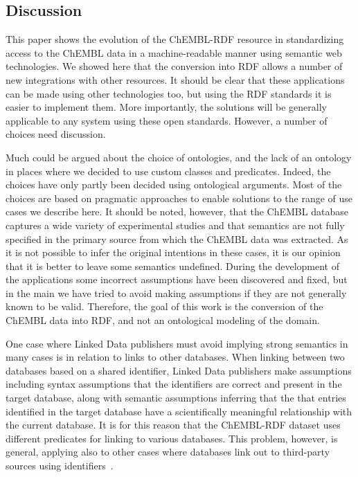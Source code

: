 \documentclass[10pt]{bmc_article}
\newenvironment{bmcformat}{\begin{raggedright}\baselineskip20pt\sloppy\setboolean{publ}{false}}{\end{raggedright}\baselineskip20pt\sloppy}
\begin{document}
\begin{bmcformat}
\section*{Discussion}

This paper shows the evolution of the ChEMBL-RDF resource in standardizing access to the
ChEMBL data in a machine-readable manner using semantic web technologies. We showed here
that the conversion into RDF allows a number of new integrations with other resources.
It should be clear that these applications can be made using other technologies too, but
using the RDF standards it is easier to implement them. More importantly, the solutions
will be generally applicable to any system using these open standards. However, a number
of choices need discussion. 

Much could be argued about the choice of ontologies, and the lack of an
ontology in places where we decided to use custom classes and predicates. Indeed, the
choices have only partly been decided using ontological arguments. Most of the choices are based
on pragmatic approaches to enable solutions to the range of use cases we describe here. It should be noted,
however, that the ChEMBL database captures a wide variety of experimental studies
and that semantics are not fully specified in the primary source from which the ChEMBL data was
extracted. As it is not possible to infer the original intentions in these cases, 
it is our opinion that it is better to leave some semantics undefined. During the 
development of the applications some incorrect assumptions have been discovered and
fixed, but in the main we have tried to avoid making assumptions if they are not generally known to be valid. 
Therefore, the goal of this work is the conversion of the ChEMBL data into
RDF, and not an ontological modeling of the domain.

One case where Linked Data publishers must avoid implying strong semantics in many cases is
in relation to links to other databases. When linking between two databases based on a shared identifier,
Linked Data publishers make assumptions including syntax assumptions that the identifiers 
are correct and present in the target database, along with semantic assumptions inferring that the
that entries identified in the target database have a scientifically meaningful relationship with the current database.
It is for this reason that the ChEMBL-RDF dataset uses different predicates for linking to various databases.
This problem, however, is general, applying also to other cases where databases link out to third-party sources using identifiers~\cite{VanIersel2010}.


\end{bmcformat}
\end{document}
